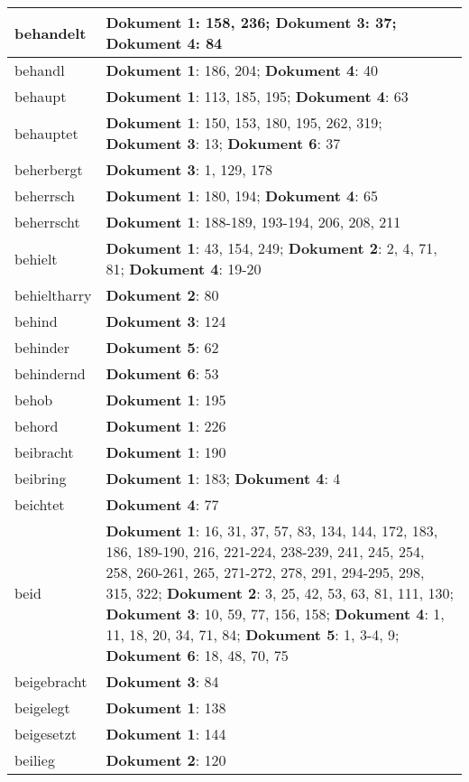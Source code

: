 \documentclass[a5paper]{article}
\begin{document}
\begin{longtable}[l]{|l|p{3in}|}
\hline
behandelt & \textbf{Dokument 1}: 158, 236; \textbf{Dokument 3}: 37; \textbf{Dokument 4}: 84 \\
\hline
behandl & \textbf{Dokument 1}: 186, 204; \textbf{Dokument 4}: 40 \\
\hline
behaupt & \textbf{Dokument 1}: 113, 185, 195; \textbf{Dokument 4}: 63 \\
\hline
behauptet & \textbf{Dokument 1}: 150, 153, 180, 195, 262, 319; \textbf{Dokument 3}: 13; \textbf{Dokument 6}: 37 \\
\hline
beherbergt & \textbf{Dokument 3}: 1, 129, 178 \\
\hline
beherrsch & \textbf{Dokument 1}: 180, 194; \textbf{Dokument 4}: 65 \\
\hline
beherrscht & \textbf{Dokument 1}: 188-189, 193-194, 206, 208, 211 \\
\hline
behielt & \textbf{Dokument 1}: 43, 154, 249; \textbf{Dokument 2}: 2, 4, 71, 81; \textbf{Dokument 4}: 19-20 \\
\hline
behieltharry & \textbf{Dokument 2}: 80 \\
\hline
behind & \textbf{Dokument 3}: 124 \\
\hline
behinder & \textbf{Dokument 5}: 62 \\
\hline
behindernd & \textbf{Dokument 6}: 53 \\
\hline
behob & \textbf{Dokument 1}: 195 \\
\hline
behord & \textbf{Dokument 1}: 226 \\
\hline
beibracht & \textbf{Dokument 1}: 190 \\
\hline
beibring & \textbf{Dokument 1}: 183; \textbf{Dokument 4}: 4 \\
\hline
beichtet & \textbf{Dokument 4}: 77 \\
\hline
beid & \textbf{Dokument 1}: 16, 31, 37, 57, 83, 134, 144, 172, 183, 186, 189-190, 216, 221-224, 238-239, 241, 245, 254, 258, 260-261, 265, 271-272, 278, 291, 294-295, 298, 315, 322; \textbf{Dokument 2}: 3, 25, 42, 53, 63, 81, 111, 130; \textbf{Dokument 3}: 10, 59, 77, 156, 158; \textbf{Dokument 4}: 1, 11, 18, 20, 34, 71, 84; \textbf{Dokument 5}: 1, 3-4, 9; \textbf{Dokument 6}: 18, 48, 70, 75 \\
\hline
beigebracht & \textbf{Dokument 3}: 84 \\
\hline
beigelegt & \textbf{Dokument 1}: 138 \\
\hline
beigesetzt & \textbf{Dokument 1}: 144 \\
\hline
beilieg & \textbf{Dokument 2}: 120 \\

\end{longtable}
\end{document}
